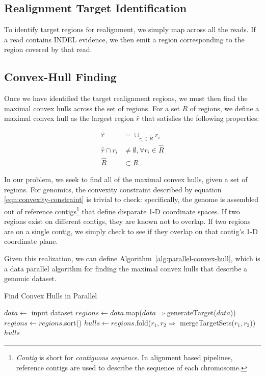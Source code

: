 \documentclass[phd]{ucbthesis}
\begin{document}
\subsection{Realignment Target Identification}
\label{sec:realignment-target-identification}

To identify target regions for realignment, we simply map across all the reads. If a read contains INDEL evidence,
we then emit a region corresponding to the region covered by that read.

\subsection{Convex-Hull Finding}
\label{sec:convex-hull}

Once we have identified the target realignment regions, we must then find the maximal convex hulls
across the set of regions. For a set $R$ of regions, we define a maximal convex hull as the largest
region $\hat{r}$ that satisfies the following properties:

\begin{align}
\label{eqn:convexity-constraint}
\hat{r} &= \cup_{r_i \in \hat{R}} r_i \\
\hat{r} \cap r_i &\ne \emptyset, \forall r_i \in \hat{R} \\
\hat{R} &\subset R
\end{align}

In our problem, we seek to find all of the maximal convex hulls, given a set of regions. For genomics, the
convexity constraint described by equation \eqref{eqn:convexity-constraint} is trivial to check: specifically, the
genome is assembled out of reference contigs\footnote{\emph{Contig} is short for \emph{contiguous
sequence}. In alignment based pipelines, reference contigs are  used to describe the sequence of each
chromosome.} that define disparate 1-D coordinate spaces. If two regions exist on different contigs, they
are known not to overlap. If two regions are on a single contig, we simply check to see if they overlap
on that contig's 1-D coordinate plane.

Given this realization, we can define Algorithm~\ref{alg:parallel-convex-hull}, which is a data parallel
algorithm for finding the maximal convex hulls that describe a genomic dataset.

\begin{algorithm}
\caption{Find Convex Hulls in Parallel}
\label{alg:parallel-convex-hull}
\begin{algorithmic}
\STATE $data \leftarrow$ input dataset
\STATE $regions \leftarrow data$.map($data \Rightarrow $generateTarget($data$))
\STATE $regions \leftarrow regions$.sort()
\STATE $hulls \leftarrow regions$.fold($r_1, r_2 \Rightarrow$ mergeTargetSets($r_1, r_2$))
\RETURN $hulls$
\end{algorithmic}
\end{algorithm}
\end{document}
